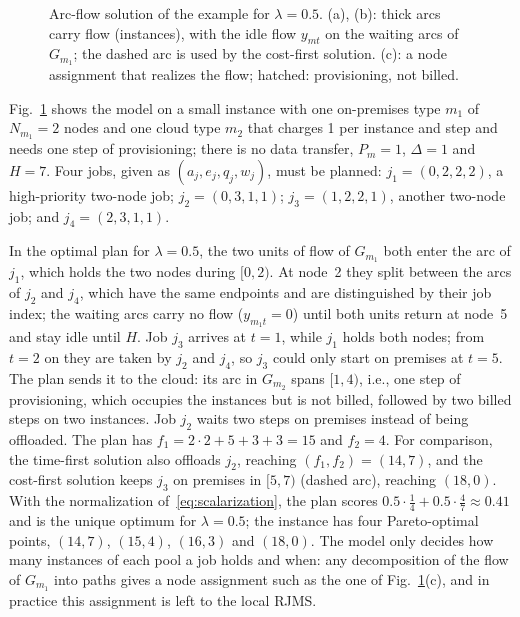 \documentclass[conference]{IEEEtran}
\begin{document}
\begin{figure}[t]
{}
\caption{Arc-flow solution of the example for $\lambda=0.5$. (a), (b): thick arcs carry flow (instances), with the idle flow $y_{mt}$ on the waiting arcs of $G_{m_1}$; the dashed arc is used by the cost-first solution. (c): a node assignment that realizes the flow; hatched: provisioning, not billed.}
\label{fig:example}
\end{figure}

Fig.~\ref{fig:example} shows the model on a small instance with one on-premises type $m_1$ of $N_{m_1}=2$ nodes and one cloud type $m_2$ that charges 1 per instance and step and needs one step of provisioning; there is no data transfer, $P_m=1$, $\Delta=1$ and $H=7$. Four jobs, given as $(a_j,e_j,q_j,w_j)$, must be planned: $j_1=(0,2,2,2)$, a high-priority two-node job; $j_2=(0,3,1,1)$; $j_3=(1,2,2,1)$, another two-node job; and $j_4=(2,3,1,1)$.

In the optimal plan for $\lambda=0.5$, the two units of flow of $G_{m_1}$ both enter the arc of $j_1$, which holds the two nodes during $[0,2)$. At node~2 they split between the arcs of $j_2$ and $j_4$, which have the same endpoints and are distinguished by their job index; the waiting arcs carry no flow ($y_{m_1t}=0$) until both units return at node~5 and stay idle until $H$. Job $j_3$ arrives at $t=1$, while $j_1$ holds both nodes; from $t=2$ on they are taken by $j_2$ and $j_4$, so $j_3$ could only start on premises at $t=5$. The plan sends it to the cloud: its arc in $G_{m_2}$ spans $[1,4)$, i.e., one step of provisioning, which occupies the instances but is not billed, followed by two billed steps on two instances. Job $j_2$ waits two steps on premises instead of being offloaded. The plan has $f_1=2\cdot2+5+3+3=15$ and $f_2=4$. For comparison, the time-first solution also offloads $j_2$, reaching $(f_1,f_2)=(14,7)$, and the cost-first solution keeps $j_3$ on premises in $[5,7)$ (dashed arc), reaching $(18,0)$. With the normalization of~\eqref{eq:scalarization}, the plan scores $0.5\cdot\frac{1}{4}+0.5\cdot\frac{4}{7}\approx0.41$ and is the unique optimum for $\lambda=0.5$; the instance has four Pareto-optimal points, $(14,7)$, $(15,4)$, $(16,3)$ and $(18,0)$. The model only decides how many instances of each pool a job holds and when: any decomposition of the flow of $G_{m_1}$ into paths gives a node assignment such as the one of Fig.~\ref{fig:example}(c), and in practice this assignment is left to the local RJMS.
\end{document}
